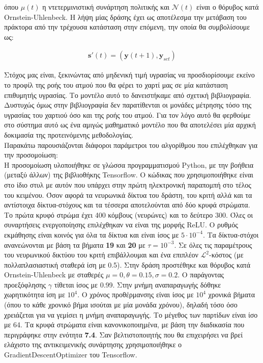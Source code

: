 \documentclass[11pt]{article} %
\numberwithin{equation}{subsection}
\begin{document}
όπου $ \mu(t)$ η ντετερμινιστική συνάρτηση πολιτικής και $\mathcal{N}(t)$ είναι ο θόρυβος κατά Ornstein-Uhlenbeck. Η λήψη μίας δράσης έχει ως αποτέλεσμα την μετάβαση του πράκτορα από την τρέχουσα κατάσταση στην επόμενη, την οποία θα συμβολίσουμε ως:

\begin{align*}
\textbf{s}'(t) = (\textbf{y}(t+1), \textbf{y}_{set})
\end{align*}

Στόχος μας είναι, ξεκινώντας από μηδενική τιμή υγρασίας να προσδιορίσουμε εκείνο το προφίλ της ροής του ατμού που θα φέρει το χαρτί μας σε μία κατάσταση επιθυμητής υγρασίας. Το μοντέλο αυτό το δανειστήκαμε από σχετική βιβλιογραφία. Δυστυχώς όμως στην βιβλιογραφία δεν παρατίθενται οι μονάδες μέτρησης τόσο της υγρασίας του χαρτιού όσο και της ροής του ατμού. Για τον λόγο αυτό θα φερθούμε στο σύστημα αυτό ως ένα αμιγώς μαθηματικό μοντέλο που θα αποτελέσει μία αρχική δοκιμασία της προτεινόμενης μεθοδολογίας. \\

Παρακάτω παρουσιάζονται διάφοροι παράμετροι του αλγορίθμου που επιλέχθηκαν για την προσομοίωση:\\

Η προσομοίωση υλοποιήθηκε σε γλώσσα προγραμματισμού Python, με την βοήθεια (μεταξύ άλλων) της βιβλιοθήκης Tensorflow. Ο κώδικας που χρησιμοποιήθηκε είναι στο ίδιο στυλ με αυτόν που υπάρχει στην πρώτη ηλεκτρονική παραπομπή στο τέλος του κειμένου. Όσον αφορά τα νευρωνικά δίκτυα του δράστη, του κριτή αλλά και τα αντίστοιχα δίκτυα-στόχους και τα τέσσερα αποτελούνται από δύο κρυφά στρώματα. Το πρώτα κρυφό στρώμα έχει 400 κόμβους (νευρώνες) και το δεύτερο 300. Όλες οι συναρτήσεις ενεργοποίησης επιλέχθηκαν να είναι της μορφής ReLU. Ο ρυθμός εκμάθησης είναι κοινός για όλα τα δίκτυα και είναι ίσος με $5 \cdot 10^{-4}$. Τα δίκτυα-στόχοι ανανεώνονται με βάση τα βήματα \textbf{19} και \textbf{20} με $\tau = 10^{-3}$. Σε όλες τις παραμέτρους του νευρωνικού δικτύου του κριτή επιβάλλουμαι και ένα επιπλέον $\mathcal{L}^2$-κόστος (με πολλαπλασιαστική σταθερά ίση με 0.5). Στην δράση προστέθηκε και θόρυβος κατά Ornstein-Uhlenbeck με σταθερές $\mu = 0, \theta = 0.15, \sigma = 0.2$. Ο παράγοντας προεξόφλησης $\gamma$ τίθεται ίσος με 0.99.  Στην μνήμη αναπαραγωγής δόθηκε χωρητικότητα ίση με $10^4$. Ο χρόνος προθέρμανσης είναι ίσος με $10^4$ χρονικά βήματα (όπου το κάθε χρονικό βήμα ισούται με μία μονάδα χρόνου), δηλαδή τόσο όσο χρειάζεται για να γεμίσει η μνήμη αναπαραγωγής. Το μέγεθος των παρτίδων είναι ίσο με 64. Τα κρυφά στρώματα είναι κανονικοποιημένα, με βάση την διαδικασία που περιγράφηκε στην ενότητα \textbf{7.4}. Σαν βελτιστοποιητής που θα επιχειρήσει να βρεί ελάχιστο της αντικειμενικής συνάρτησης χρησιμοποιήθηκε ο GradientDescentOptimizer του Tensorflow.  \\
\end{document}
